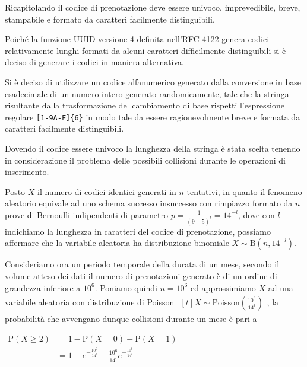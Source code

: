 Ricapitolando il codice di prenotazione deve essere univoco, imprevedibile,
breve, stampabile e formato da caratteri facilmente distinguibili.

Poiché la funzione UUID versione 4 definita nell'RFC 4122 genera codici
relativamente lunghi formati da alcuni caratteri difficilmente distinguibili
si è deciso di generare i codici in maniera alternativa.

Si è deciso di utilizzare un codice alfanumerico generato dalla conversione in
base esadecimale di un numero intero generato randomicamente, tale che 
la stringa risultante dalla trasformazione del cambiamento di base rispetti
l'espressione regolare \verb|[1-9A-F]{6}| in modo tale da essere ragionevolmente
breve e formata da caratteri facilmente distinguibili.

Dovendo il codice essere univoco la lunghezza della stringa è stata scelta
tenendo in considerazione il problema delle possibili collisioni durante le
operazioni di inserimento.

Posto $X$ il numero di codici identici generati in $n$ tentativi, in quanto
il fenomeno aleatorio equivale ad uno schema successo insuccesso con rimpiazzo
formato da $n$ prove di Bernoulli indipendenti di parametro
$p = \frac{1}{\left( 9 + 5 \right)^l} = 14^{-l}$,
dove con $l$ indichiamo la lunghezza in caratteri del codice di prenotazione,
possiamo affermare che la variabile aleatoria ha distribuzione binomiale
$X \sim \mathrm{B}\left( n, 14^{-l} \right)$.

Consideriamo ora un periodo temporale della durata di un mese, secondo il volume
atteso dei dati il numero di prenotazioni generato è di un ordine di grandezza
inferiore a $10^6$. Poniamo quindi $n = 10^6$ ed approssimiamo $X$ ad una
variabile aleatoria con distribuzione di Poisson
$\begin{aligned}[t]
        X \sim \mathrm{Poisson}\left( \frac{10^6}{14^l} \right)
    \end{aligned}$,
la probabilità che avvengano dunque collisioni durante un mese è pari a

$\begin{aligned}
        \mathrm{P}\left( X \geq 2 \right)
         & = 1 - \mathrm{P}\left( X = 0 \right)
        - \mathrm{P}\left( X = 1 \right)           \\
         & = 1 - e^{-\frac{10^6}{14^l}}
        - \frac{10^6}{14^l} e^{-\frac{10^6}{14^l}} \\
    \end{aligned}$

